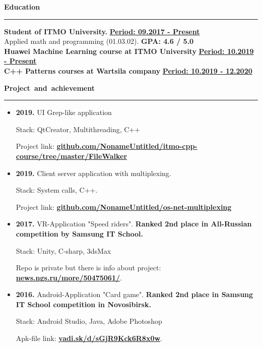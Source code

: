 \documentclass[11pt,a4paper]{report}
\begin{document}
\par\hbox{\Large\textbf{Education}}\kern5pt\hrule\kern5pt

\textbf{Student of ITMO University.}
\hfill
\textbf{\underline{Period: 09.2017 - Present}} \\


Applied math and programming (01.03.02).
\hfill
\textbf{\Large GPA: 4.6 / 5.0} \\


\textbf{Huawei Machine Learning course at ITMO University}
\hfill
\textbf{\underline{Period: 10.2019 - Present}} \\

\textbf{C++ Patterns courses at Wartsila company}
\hfill
\textbf{\underline{Period: 10.2019 - 12.2020}} \\


\par\hbox{\Large\textbf{Project and achievement}}\kern5pt\hrule\kern5pt
\begin{itemize}

\item \textbf{2019.} UI Grep-like application

Stack: QtCreator, Multithreading, C++

Project link: 
\textbf{
    \href{https://www.github.com/NonameUntitled/itmo-cpp-course/tree/master/FileWalker}
    {github.com/NonameUntitled/itmo-cpp-course/tree/master/FileWalker}
}

\item \textbf{2019.} Client server application with multiplexing.

Stack: System calls, C++.

Project link: 
\textbf{
    \href{https://www.github.com/NonameUntitled/os-net-multiplexing}
    {github.com/NonameUntitled/os-net-multiplexing}
}


\item \textbf{2017.} VR-Application "Speed riders". \textbf{Ranked 2nd place in All-Russian competition by Samsung IT School.}

Stack: Unity, C-sharp, 3dsMax

Repo is private but there is info about project: 
\textbf{\href{http://news.ngs.ru/more/50475061/}{news.ngs.ru/more/50475061/}}.

\item \textbf{2016.} Android-Application "Card game". \textbf{Ranked 2nd place in Samsung IT School competition in Novosibirsk.} 

Stack: Android Studio, Java, Adobe Photoshop

Apk-file link: \textbf{\href{https://www.yadi.sk/d/sGjR9Kck6R8x0w}{yadi.sk/d/sGjR9Kck6R8x0w}}.

\end{itemize}
\end{document}
